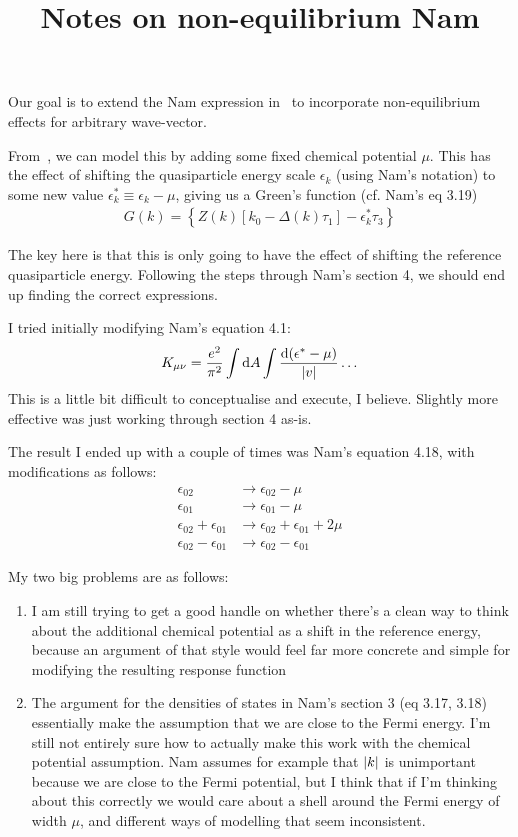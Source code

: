 \documentclass{article}
\title{Notes on non-equilibrium Nam}
\begin{document}
\maketitle

Our goal is to extend the Nam expression in~\cite{Nam1967} to incorporate non-equilibrium effects for arbitrary wave-vector.

From~\cite{Gao2008}, we can model this by adding some fixed chemical potential $\mu$.
This has the effect of shifting the quasiparticle energy scale $\epsilon_k$ (using Nam's notation) to some new value $\epsilon_k^\ast \equiv \epsilon_k - \mu$, giving us a Green's function (cf. Nam's eq 3.19)
\begin{align}
	G(k) = \left\{ Z(k) \left[ k_0 - \Delta(k) \tau_1 \right] - \epsilon_k^\ast \tau_3 \right\}
\end{align}

The key here is that this is only going to have the effect of shifting the reference quasiparticle energy.
Following the steps through Nam's section 4, we should end up finding the correct expressions.

I tried initially modifying Nam's equation 4.1:
\begin{equation}
	K_{\mu\nu} = \frac{e^2}{\pi^2}\int \dd{A} \int \frac{\dd{(\epsilon^\ast - \mu)}}{\abs{v}} \ldots
\end{equation}
This is a little bit difficult to conceptualise and execute, I believe.
Slightly more effective was just working through section 4 as-is.

The result I ended up with a couple of times was Nam's equation 4.18, with modifications as follows:
\begin{align}
	\epsilon_{02} &\rightarrow \epsilon_{02} - \mu \\
	\epsilon_{01} &\rightarrow \epsilon_{01} - \mu \\
	\epsilon_{02} + \epsilon_{01} &\rightarrow \epsilon_{02} + \epsilon_{01} + 2 \mu \\
	\epsilon_{02} - \epsilon_{01} &\rightarrow \epsilon_{02} - \epsilon_{01}
\end{align}

My two big problems are as follows:
\begin{enumerate}
	\item I am still trying to get a good handle on whether there's a clean way to think about the additional chemical potential as a shift in the reference energy, because an argument of that style would feel far more concrete and simple for modifying the resulting response function
	\item The argument for the densities of states in Nam's section 3 (eq 3.17, 3.18) essentially make the assumption that we are close to the Fermi energy. I'm still not entirely sure how to actually make this work with the chemical potential assumption. Nam assumes for example that $\abs{k}$ is unimportant because we are close to the Fermi potential, but I think that if I'm thinking about this correctly we would care about a shell around the Fermi energy of width $\mu$, and different ways of modelling that seem inconsistent.
\end{enumerate}

\printbibliography
\end{document}

